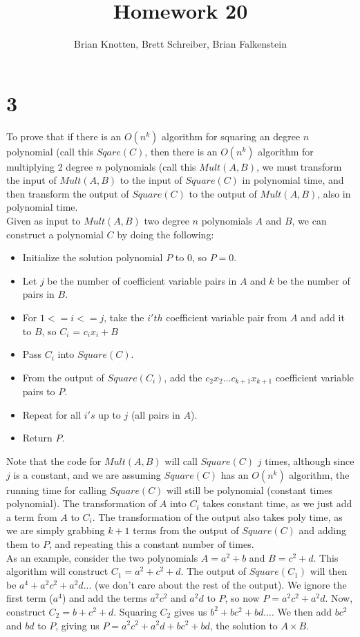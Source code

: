 \documentclass[letterpaper,notitlepage,twoside]{article}
\begin{document}
\title{Homework 20}
\author{Brian Knotten, Brett Schreiber, Brian Falkenstein}
\maketitle
\section*{3}
To prove that if there is an $O(n^k)$ algorithm for squaring an degree $n$ polynomial (call this $Sqare(C)$, then there is an $O(n^k)$ algorithm for multiplying 2 degree $n$ polynomials (call this $Mult(A, B)$, we must transform the input of $Mult(A, B)$ to the input of $Square(C)$ in polynomial time, and then transform the output of $Square(C)$ to the output of $Mult(A, B)$, also in polynomial time. \\
Given as input to $Mult(A, B)$ two degree $n$ polynomials $A$ and $B$, we can construct a polynomial $C$ by doing the following: 
\begin{itemize}
\item Initialize the solution polynomial $P$ to 0, so $P=0$. 
\item Let $j$ be the number of coefficient variable pairs in $A$ and $k$ be the number of pairs in $B$. 
\item For $1<=i<=j$, take the $i'th$ coefficient variable pair from $A$ and add it to $B$, so $C_i$ = $c_ix_i + B$
\item Pass $C_i$ into $Square(C)$.
\item From the output of $Square(C_i)$, add the $c_2x_2 ... c_{k+1}x_{k+1}$ coefficient variable pairs to $P$. 
\item Repeat for all $i's$ up to $j$ (all pairs in $A$). 
\item Return $P$. 
\end{itemize}
Note that the code for $Mult(A, B)$ will call $Square(C)$ $j$ times, although since $j$ is a constant, and we are assuming $Square(C)$ has an $O(n^k)$ algorithm, the running time for calling $Square(C)$ will still be polynomial (constant times polynomial). The transformation of $A$ into $C_i$ takes constant time, as we just add a term from $A$ to $C_i$. The transformation of the output also takes poly time, as we are simply grabbing $k+1$ terms from the output of $Square(C)$ and adding them to $P$, and repeating this a constant number of times. \\
As an example, consider the two polynomials $A=a^2 + b$ and $B = c^2 + d$. This algorithm will construct $C_1 = a^2 + c^2 + d$. The output of $Square(C_1)$ will then be $a^4 + a^2c^2 + a^2d...$ (we don't care about the rest of the output). We ignore the first term ($a^4$) and add the terms $a^2c^2$ and $a^2d$ to $P$, so now $P = a^2c^2 + a^2d$. Now, construct $C_2 = b + c^2 + d$. Squaring $C_2$ gives us $b^2 + bc^2 + bd ...$. We then add $bc^2$ and $bd$ to $P$, giving us $P=a^2c^2 + a^2d + bc^2 + bd$, the solution to $A\times B$. 
\end{document}
